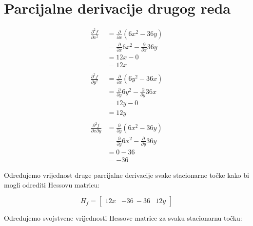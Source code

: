 \documentclass[12pt,a4paper]{report}
\begin{document}
\section{Parcijalne derivacije drugog reda}

\begin{align*}
    \frac{\partial^2 f}{\partial x^2} & = \frac{\partial}{\partial x} (6x^2 - 36y)\\
    & = \frac{\partial}{\partial x} 6x^2 - \frac{\partial}{\partial x} 36y\\
    & = 12x - 0\\
    & = 12x\\
    \\
    \frac{\partial^2 f}{\partial y^2} & = \frac{\partial}{\partial x} (6y^2 - 36x)\\
    & = \frac{\partial}{\partial y} 6y^2 - \frac{\partial}{\partial y} 36x\\
    & = 12y - 0\\
    & = 12y\\
    \\
    \frac{\partial^2 f}{\partial x \partial y} & = \frac{\partial}{\partial y} (6x^2 - 36y) \\
    & = \frac{\partial}{\partial y} 6x^2 - \frac{\partial}{\partial y} 36y \\
    & = 0 - 36 \\
    & = -36
\end{align*}

Određujemo vrijednost druge parcijalne derivacije svake stacionarne točke kako bi mogli odrediti Hessovu matricu:

$$H_f = \begin{bmatrix} 12x & -36 \ -36 & 12y \end{bmatrix}$$

Određujemo svojstvene vrijednosti Hessove matrice za svaku stacionarnu točku:


\end{document}
